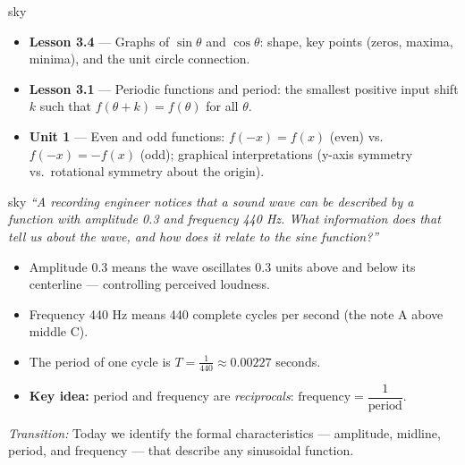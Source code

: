 \documentclass[10pt]{article}
\begin{document}
\begin{skillbox}{sky}
  \begin{itemize}
    \item \textbf{Lesson 3.4} --- Graphs of $\sin\theta$ and $\cos\theta$: shape,
          key points (zeros, maxima, minima), and the unit circle connection.
    \item \textbf{Lesson 3.1} --- Periodic functions and period: the smallest
          positive input shift $k$ such that $f(\theta+k)=f(\theta)$ for all $\theta$.
    \item \textbf{Unit 1} --- Even and odd functions: $f(-x)=f(x)$ (even) vs.\
          $f(-x)=-f(x)$ (odd); graphical interpretations (y-axis symmetry vs.\
          rotational symmetry about the origin).
  \end{itemize}
\end{skillbox}

\begin{skillbox}[Hook]{sky}
  \textit{``A recording engineer notices that a sound wave can be described by a
  function with amplitude 0.3 and frequency 440 Hz. What information does that
  tell us about the wave, and how does it relate to the sine function?''}

  \medskip
  \begin{itemize}
    \item Amplitude 0.3 means the wave oscillates 0.3 units above and below its
          centerline --- controlling perceived loudness.
    \item Frequency 440 Hz means 440 complete cycles per second (the note A above
          middle C).
    \item The period of one cycle is $T = \tfrac{1}{440} \approx 0.00227$ seconds.
    \item \textbf{Key idea:} period and frequency are \textit{reciprocals}:
          $\text{frequency} = \dfrac{1}{\text{period}}$.
  \end{itemize}

  \smallskip
  \textit{Transition:} Today we identify the formal characteristics --- amplitude,
  midline, period, and frequency --- that describe any sinusoidal function.
\end{skillbox}
\end{document}
